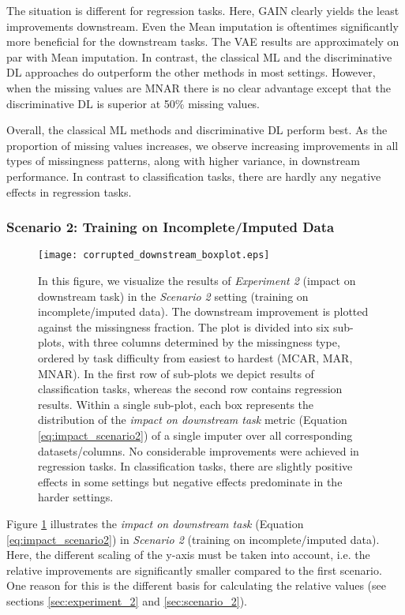 The situation is different for regression tasks. Here, GAIN clearly yields the least improvements downstream. Even the Mean imputation is oftentimes significantly more beneficial for the downstream tasks. The VAE results are approximately on par with Mean imputation. In contrast, the classical ML and the discriminative DL approaches do outperform the other methods in most settings. However, when the missing values are MNAR there is no clear advantage except that the discriminative DL is superior at 50\% missing values.

Overall, the classical ML methods and discriminative DL perform best. As the proportion of missing values increases, we observe increasing improvements in all types of missingness patterns, along with higher variance, in downstream performance. In contrast to classification tasks, there are hardly any negative effects in regression tasks.

\subsubsection{Scenario 2: Training on Incomplete/Imputed Data}


\begin{figure}\centering
	\texttt{[image: corrupted\_downstream\_boxplot.eps]}

	\caption[Downstream Ranks - Corrupted]{In this figure, we visualize the results of \textit{Experiment 2} (impact on downstream task) in the \textit{Scenario 2} setting (training on incomplete/imputed data). The downstream improvement is plotted against the missingness fraction. The plot is divided into six sub-plots, with three columns determined by the missingness type, ordered by task difficulty from easiest to hardest (MCAR, MAR, MNAR). In the first row of sub-plots we depict results of classification tasks, whereas the second row contains regression results. Within a single sub-plot, each box represents the distribution of the \textit{impact on downstream task} metric (Equation \ref{eq:impact_scenario2}) of a single imputer over all corresponding datasets/columns. No considerable improvements were achieved in regression tasks. In classification tasks, there are slightly positive effects in some settings but negative effects predominate in the harder settings.
    }
	\label{fig:corrupted_downstream_boxplot}
\end{figure}

Figure \ref{fig:corrupted_downstream_boxplot} illustrates the \textit{impact on downstream task} (Equation \ref{eq:impact_scenario2}) in \textit{Scenario 2} (training on incomplete/imputed data). Here, the different scaling of the y-axis must be taken into account, i.e. the relative improvements are significantly smaller compared to the first scenario. One reason for this is the different basis for calculating the relative values (see sections \ref{sec:experiment_2} and \ref{sec:scenario_2}). 

